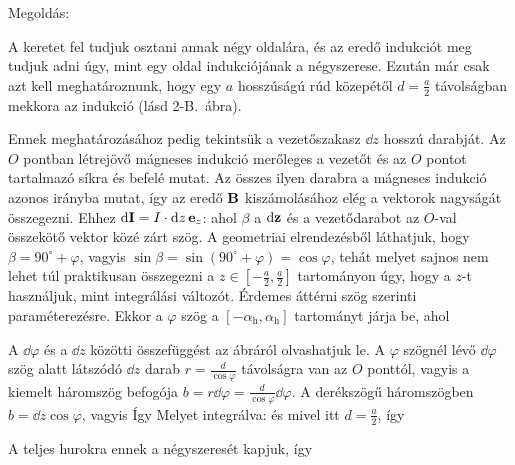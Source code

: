 
\ifdefined\megoldas
  
 Megoldás: 

 A keretet fel tudjuk osztani annak négy oldalára, és az eredő indukciót meg tudjuk adni úgy, mint egy oldal indukciójának a négyszerese. Ezután már csak azt kell meghatároznunk, hogy egy $a$ hosszúságú rúd közepétől $d=\frac{a}{2}$ távolságban mekkora az indukció (lásd 2-B.~ábra).

 Ennek meghatározásához pedig tekintsük a vezetőszakasz $\dd z$ hosszú darabját. Az $O$ pontban létrejövő mágneses indukció merőleges a vezetőt és az $O$ pontot tartalmazó síkra és befelé mutat. Az összes ilyen darabra a mágneses indukció azonos irányba mutat, így az eredő $\mathbf{B}$ kiszámolásához elég a vektorok nagyságát összegezni. Ehhez $\mathrm{d} \mathbf{I} = I\cdot \mathrm{d} z\,\mathbf{e}_z$:
 ahol $\beta$ a $\mathrm{d} \mathbf{z}$ és a vezetődarabot az $O$-val összekötő vektor közé zárt szög. A geometriai elrendezésből láthatjuk, hogy $\beta=90^\circ+\varphi$, vagyis $\sin\beta = \sin(90^\circ+\varphi) = \cos\varphi$, tehát
 melyet sajnos nem lehet túl praktikusan összegezni a $z\in\left[-\frac{a}{2},\frac{a}{2}\right]$ tartományon úgy, hogy a $z$-t használjuk, mint integrálási változót. Érdemes áttérni szög szerinti paraméterezésre. Ekkor a $\varphi$ szög a $[-\alpha_\text{h},\alpha_\text{h}]$ tartományt járja be, ahol

 A $\dd\varphi$ és a $\dd z$ közötti összefüggést az ábráról olvashatjuk le. A $\varphi$ szögnél lévő $\dd\varphi$ szög alatt látszódó $\dd z$ darab $r=\frac{d}{\cos\varphi}$ távolságra van az $O$ ponttól, vagyis a kiemelt háromszög befogója $b=r\dd\varphi=\frac{d}{\cos\varphi}\dd\varphi$. A derékszögű háromszögben $b=\dd z\cos\varphi$, vagyis
 Így
 Melyet integrálva:
 és mivel itt $d=\frac{a}{2}$, így

 A teljes hurokra ennek a négyszeresét kapjuk, így

\fi